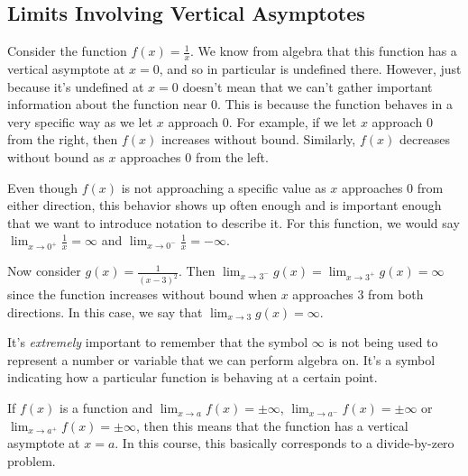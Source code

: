 \documentclass[10pt,]{book}
\theoremstyle{ptxplainnotitle}
\theoremstyle{ptxplaintitle}
\theoremstyle{ptxplainnotitle}
\theoremstyle{ptxplaintitle}
\theoremstyle{ptxplainnotitle}
\theoremstyle{ptxplaintitle}
\theoremstyle{ptxdefinitionnotitle}
\theoremstyle{ptxdefinitiontitle}
\theoremstyle{ptxdefinitionnotitle}
\theoremstyle{ptxdefinitiontitle}
\theoremstyle{ptxdefinitionnotitle}
\theoremstyle{ptxdefinitiontitle}
\theoremstyle{ptxdefinitionnotitle}
\theoremstyle{ptxdefinitiontitle}
\theoremstyle{ptxdefinitionnotitle}
\theoremstyle{ptxdefinitiontitle}
\numberwithin{equation}{section}
\begin{document}
\subsection[{Limits Involving Vertical Asymptotes}]{Limits Involving Vertical Asymptotes}\label{subsection-limits-involving-vertical-asymptotes}
\hypertarget{p-52}{}%
Consider the function \(f(x)=\frac{1}{x}\). We know from algebra that this function has a vertical asymptote at \(x=0\), and so in particular is undefined there. However, just because it's undefined at \(x=0\) doesn't mean that we can't gather important information about the function near \(0\). This is because the function behaves in a very specific way as we let \(x\) approach \(0\). For example, if we let \(x\) approach \(0\) from the right, then \(f(x)\) increases without bound. Similarly, \(f(x)\) decreases without bound as \(x\) approaches \(0\) from the left.%
\par
\hypertarget{p-53}{}%
Even though \(f(x)\) is not approaching a specific value as \(x\) approaches \(0\) from either direction, this behavior shows up often enough and is important enough that we want to introduce notation to describe it. For this function, we would say \(\lim_{x\to0^{+}}\frac{1}{x}=\infty\) and \(\lim_{x\to0^{-}}\frac{1}{x}=-\infty\).%
\par
\hypertarget{p-54}{}%
Now consider \(g(x) = \frac{1}{(x-3)^{2}}\). Then \(\lim_{x\to3^{-}}g(x) = \lim_{x\to3^{+}}g(x) = \infty\) since the function increases without bound when \(x\) approaches \(3\) from both directions. In this case, we say that \(\lim_{x\to3}g(x)=\infty\).%
\begin{aside}{}\label{aside-2}
\hypertarget{p-55}{}%
It's \emph{extremely} important to remember that the symbol \(\infty\) is not being used to represent a number or variable that we can perform algebra on. It's a symbol indicating how a particular function is behaving at a certain point.%
\end{aside}
\hypertarget{p-56}{}%
If \(f(x)\) is a function and \(\lim_{x\to a}f(x)=\pm\infty\), \(\lim_{x\to a^{-}}f(x)=\pm\infty\) or \(\lim_{x\to a^{+}}f(x)=\pm\infty\), then this means that the function has a vertical asymptote at \(x=a\). In this course, this basically corresponds to a divide-by-zero problem.%
\end{document}
